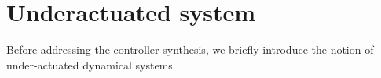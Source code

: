 


\section{Underactuated system}
Before addressing the controller synthesis, we briefly introduce the notion of under-actuated dynamical systems \cite{Tedrake2009,Santina2019,Spong1998,Spong1996}. 

